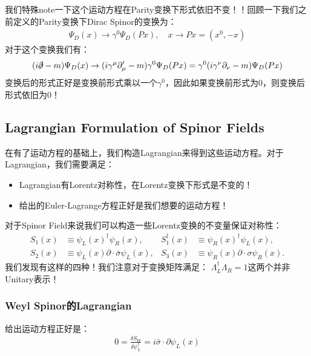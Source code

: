 
我们特殊note一下这个运动方程在Parity变换下形式依旧不变！！回顾一下我们之前定义的Parity变换下Dirac Spinor的变换为：
\begin{align}
  \Psi_D(x) \to \gamma^0 \Psi_D(Px), \quad x \to Px = (x^0,-x)
\end{align}
对于这个变换我们有：
\begin{align}
  (i\slashed{\partial}-m)\Psi_D(x) \to (i\gamma^\mu \partial_\mu' - m) \gamma^0 \Psi_D(Px) = \gamma^0 (i\gamma^\nu \partial_\nu - m) \Psi_D(Px)
\end{align}
变换后的形式正好是变换前形式乘以一个$ \gamma^0 $，因此如果变换前形式为0，则变换后形式依旧为0！


\subsection{Lagrangian Formulation of Spinor Fields}

在有了运动方程的基础上，我们构造Lagrangian来得到这些运动方程。对于Lagrangian，我们需要满足：
\begin{itemize}
  \item Lagrangian有Lorentz对称性，在Lorentz变换下形式是不变的！
    \item 给出的Euler-Lagrange方程正好是我们想要的运动方程！
\end{itemize}

\bigskip
{}

对于Spinor Field来说我们可以构造一些Lorentz变换的不变量保证对称性：
\begin{align}
  S_1(x)&\equiv\psi_L(x)^\dagger\psi_R(x),&S_1^\dagger(x)&\equiv\psi_R(x)^\dagger\psi_L(x),\\S_2(x)&\equiv\psi_L(x)\partial\cdot\bar{\sigma}\psi_L(x),&S_3(x)&\equiv\psi_R(x)\partial\cdot\sigma\psi_R(x).
\end{align}
我们发现有这样的四种！我们注意对于变换矩阵满足： $ \Lambda_L^\dagger \Lambda_R = 1 $这两个并非Unitary表示！

\subsubsection{Weyl Spinor的Lagrangian}

给出运动方程正好是：
\begin{align}
  0=\frac{\delta S_W}{\delta\psi_L^\dagger}=i\bar{\sigma}\cdot\partial\psi_L(x)
\end{align}

